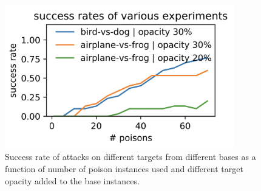 \documentclass[11pt]{article}
\numberwithin{equation}{section}
\def\g{{\bf g}}
\def\w{{\bf w}}
\def\x{{\bf x}}
\def\SM{{\mathcal S}}
\def\RB{{\mathbb R}}
\begin{document}
\begin{figure}[!h]
	\centering
	\includegraphics[width=10cm]{figures/end2end_successful_rate.png}
	\caption{Success rate of attacks on different targets from different bases as a function of number of poison instances used and different target opacity added to the base instances.}
\end{figure}



\end{document}
